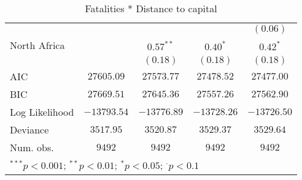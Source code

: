 \begin{sidewaystable}
\begin{center}
{\begin{tabular}{l c c c c}
                                         &               &               &                 & $(0.06)$        \\
North Africa                             &               & $0.57^{**}$   & $0.40^{*}$      & $0.42^{*}$      \\
                                         &               & $(0.18)$      & $(0.18)$        & $(0.18)$        \\
\midrule
AIC                                      & $27605.09$    & $27573.77$    & $27478.52$      & $27477.00$      \\
BIC                                      & $27669.51$    & $27645.36$    & $27557.26$      & $27562.90$      \\
Log Likelihood                           & $-13793.54$   & $-13776.89$   & $-13728.26$     & $-13726.50$     \\
Deviance                                 & $3517.95$     & $3520.87$     & $3529.37$       & $3529.64$       \\
Num. obs.                                & $9492$        & $9492$        & $9492$          & $9492$          \\
\bottomrule
\multicolumn{5}{l}{\scriptsize{$^{***}p<0.001$; $^{**}p<0.01$; $^{*}p<0.05$; $^{\cdot}p<0.1$}}
\end{tabular}
}
\caption{Fatalities * Distance to capital}
\label{interaction_statebaseddeaths}
\end{center}
\end{sidewaystable}
